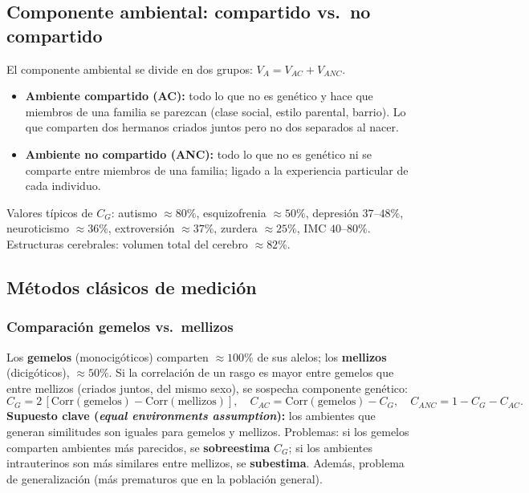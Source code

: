 \documentclass[11pt, a4paper]{article}
\begin{document}
\subsection{Componente ambiental: compartido vs.\ no compartido}

El componente ambiental se divide en dos grupos: $V_A = V_{AC} + V_{ANC}$.
\begin{itemize}[nosep]
    \item \textbf{Ambiente compartido (AC):} todo lo que no es gen\'etico y hace que miembros de una familia se parezcan (clase social, estilo parental, barrio). Lo que comparten dos hermanos criados juntos pero no dos separados al nacer.
    \item \textbf{Ambiente no compartido (ANC):} todo lo que no es gen\'etico ni se comparte entre miembros de una familia; ligado a la experiencia particular de cada individuo.
\end{itemize}

Valores t\'ipicos de $C_G$: autismo $\approx 80\%$, esquizofrenia $\approx 50\%$, depresi\'on $37$--$48\%$, neuroticismo $\approx 36\%$, extroversi\'on $\approx 37\%$, zurdera $\approx 25\%$, IMC $40$--$80\%$. Estructuras cerebrales: volumen total del cerebro $\approx 82\%$.

\subsection{M\'etodos cl\'asicos de medici\'on}

\subsubsection{Comparaci\'on gemelos vs.\ mellizos}

Los \textbf{gemelos} (monocig\'oticos) comparten $\approx 100\%$ de sus alelos; los \textbf{mellizos} (dicig\'oticos), $\approx 50\%$. Si la correlaci\'on de un rasgo es mayor entre gemelos que entre mellizos (criados juntos, del mismo sexo), se sospecha componente gen\'etico:
\[
    C_G = 2\,[\mathrm{Corr}(\text{gemelos}) - \mathrm{Corr}(\text{mellizos})], \quad
    C_{AC} = \mathrm{Corr}(\text{gemelos}) - C_G, \quad
    C_{ANC} = 1 - C_G - C_{AC}.
\]
\textbf{Supuesto clave (\emph{equal environments assumption}):} los ambientes que generan similitudes son iguales para gemelos y mellizos. Problemas: si los gemelos comparten ambientes m\'as parecidos, se \textbf{sobreestima} $C_G$; si los ambientes intrauterinos son m\'as similares entre mellizos, se \textbf{subestima}. Adem\'as, problema de generalizaci\'on (m\'as prematuros que en la poblaci\'on general).
\end{document}

